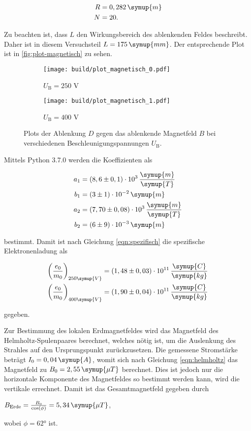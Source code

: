 \begin{align*}
  R &= 0,282 \, \symup{m} \\
  N &= 20.
\end{align*}

Zu beachten ist, dass $L$ den Wirkungsbereich des ablenkenden Feldes beschreibt.
Daher ist in diesem Versuchsteil $L = 175 \, \symup{mm}$.
Der entsprechende Plot ist in \autoref{fig:plot-magnetisch} zu sehen.

\begin{figure}
  \centering
  \begin{subfigure}{0.49\textwidth}
    \centering
    \texttt{[image: build/plot\_magnetisch\_0.pdf]}
    \caption{$U_\text{B} = 250$ V}
  \end{subfigure}
  \begin{subfigure}{0.49\textwidth}
    \centering
    \texttt{[image: build/plot\_magnetisch\_1.pdf]}
    \caption{$U_\text{B} = 400$ V}
  \end{subfigure}
  \caption{Plots der Ablenkung $D$ gegen das ablenkende Magnetfeld $B$ bei verschiedenen Beschleunigungspannungen $U_\text{B}$.}
  \label{fig:plot-magnetisch}
\end{figure}

Mittels Python 3.7.0 werden die Koeffizienten als

\begin{align*}
  a_1 &= (8,6 \pm 0,1) \cdot 10^{3} \, \frac{\symup{m}}{\symup{T}} \\
  b_1 &= (3 \pm 1) \cdot 10^{-2} \, \symup{m} \\
  a_2 &= (7,70 \pm 0,08) \cdot 10^{3} \, \frac{\symup{m}}{\symup{T}} \\
  b_2 &= (6 \pm 9) \cdot 10^{-3} \, \symup{m}
\end{align*}

bestimmt.
Damit ist nach Gleichung \eqref{eqn:spezifisch} die spezifische Elektronenladung als 

\begin{align*}
  \bigg( \frac{e_0}{m_0} \bigg)_{250 \symup{V}} &= (1,48 \pm 0,03) \cdot 10^{11} \, \frac{\symup{C}}{\symup{kg}} \\
  \bigg( \frac{e_0}{m_0} \bigg)_{400 \symup{V}} &= (1,90 \pm 0,04) \cdot 10^{11} \, \frac{\symup{C}}{\symup{kg}}
\end{align*}

gegeben.

Zur Bestimmung des lokalen Erdmagnetfeldes wird das Magnetfeld des Helmholtz-Spulenpaares berechnet, welches nötig ist,
um die Auslenkung des Strahles auf den Ursprungspunkt zurückzusetzen.
Die gemessene Stromstärke beträgt $I_0 = 0,04 \, \symup{A}$, womit sich nach Gleichung \eqref{eqn:helmholtz} das Magnetfeld zu $B_0 = 2,55 \, \symup{\mu T}$ berechnet.
Dies ist jedoch nur die horizontale Komponente des Magnetfeldes so bestimmt werden kann, wird die vertikale errechnet.
Damit ist das Gesamtmagnetfeld gegeben durch

\begin{center}
  $B_\text{Erde} = \frac{B_0}{\cos ( \phi )} = 5,34 \, \symup{\mu T}$,
\end{center}

wobei $\phi = 62°$ ist.